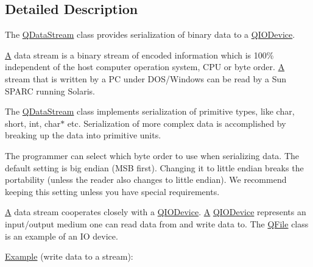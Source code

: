 \subsection{Detailed Description}
The \mbox{\hyperlink{class_q_data_stream}{Q\+Data\+Stream}} class provides serialization of binary data to a \mbox{\hyperlink{class_q_i_o_device}{Q\+I\+O\+Device}}. 

\mbox{\hyperlink{class_a}{A}} data stream is a binary stream of encoded information which is 100\% independent of the host computer operation system, C\+PU or byte order. \mbox{\hyperlink{class_a}{A}} stream that is written by a PC under D\+O\+S/\+Windows can be read by a Sun S\+P\+A\+RC running Solaris.

The \mbox{\hyperlink{class_q_data_stream}{Q\+Data\+Stream}} class implements serialization of primitive types, like {\ttfamily char}, {\ttfamily short}, {\ttfamily int}, {\ttfamily char$\ast$} etc. Serialization of more complex data is accomplished by breaking up the data into primitive units.

The programmer can select which byte order to use when serializing data. The default setting is big endian (M\+SB first). Changing it to little endian breaks the portability (unless the reader also changes to little endian). We recommend keeping this setting unless you have special requirements.

\mbox{\hyperlink{class_a}{A}} data stream cooperates closely with a \mbox{\hyperlink{class_q_i_o_device}{Q\+I\+O\+Device}}. \mbox{\hyperlink{class_a}{A}} \mbox{\hyperlink{class_q_i_o_device}{Q\+I\+O\+Device}} represents an input/output medium one can read data from and write data to. The \mbox{\hyperlink{class_q_file}{Q\+File}} class is an example of an IO device.

\mbox{\hyperlink{struct_example}{Example}} (write data to a stream)\+: 
\begin{DoxyCode}{0}
\end{DoxyCode}


